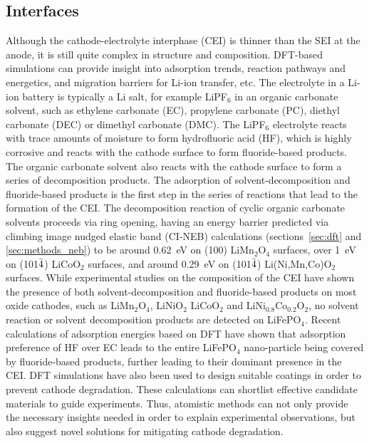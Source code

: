 \documentclass[../main.tex]{subfiles}
\begin{document}
\subsection{Interfaces}
\label{sec:cathode_interfaces}
Although the cathode-electrolyte interphase (CEI) is thinner than the SEI at the anode, it is still quite complex in structure and composition.\cite{Gauthier2015,Edstrom2004} DFT-based simulations can provide insight into adsorption trends,\cite{Bhandari2020} reaction pathways and energetics,\cite{Tebbe2015a, Tebbe2015b} and migration barriers for Li-ion transfer,\cite{Bhandari2019} etc. The electrolyte in a Li-ion battery is typically a Li salt, for example LiPF$_6$ in an organic carbonate solvent, such as ethylene carbonate (EC), propylene carbonate (PC), diethyl carbonate (DEC) or dimethyl carbonate (DMC). The LiPF$_6$ electrolyte reacts with trace amounts of moisture to form hydrofluoric acid (HF),\cite{Tebbe2015a} which is highly corrosive and reacts with the cathode surface to form fluoride-based products.\cite{Tebbe2015b} The organic carbonate solvent also reacts with the cathode surface to form a series of decomposition products.\cite{Tebbe2016} The adsorption of solvent-decomposition and fluoride-based products is the first step in the series of reactions that lead to the formation of the CEI. The decomposition reaction of cyclic organic carbonate solvents proceeds via ring opening, having an energy barrier predicted via climbing image nudged elastic band (CI-NEB) calculations (sections~\ref{sec:dft} and \ref{sec:methods_neb}) to be around 0.62~eV on (100) LiMn$_2$O$_4$ surfaces,\cite{leung2012first} over 1~eV on (101$\Bar{4}$) LiCoO$_2$ surfaces,\cite{Tebbe2016} and around 0.29~eV on (101$\Bar{4}$) Li(Ni,Mn,Co)O$_2$ surfaces\cite{Xu2017}. While experimental studies on the composition of the CEI have shown the presence of both solvent-decomposition and fluoride-based products on most oxide cathodes, such as LiMn$_2$O$_4$, LiNiO$_2$ LiCoO$_2$ and LiNi$_{0.8}$Co$_{0.2}$O$_2$, no solvent reaction or solvent decomposition products are detected on LiFePO$_4$.\cite{Edstrom2004, Malmgren2010} Recent calculations of adsorption energies based on DFT have shown that adsorption preference of HF over EC leads to the entire LiFePO$_4$ nano-particle being covered by fluoride-based products, further leading to their dominant presence in the CEI.\cite{Bhandari2020} DFT simulations have also been used to design suitable coatings in order to prevent cathode degradation.\cite{Tebbe2015b} These calculations can shortlist effective candidate materials to guide experiments. Thus, atomistic methods can not only provide the necessary insights needed in order to explain experimental observations, but also suggest novel solutions for mitigating cathode degradation.
\end{document}
